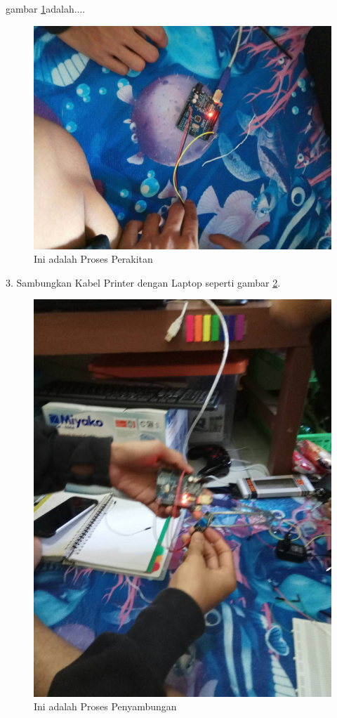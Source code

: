  gambar \ref{ar6}adalah....
  \begin{figure}[ht]
  \centerline{\includegraphics[width=.75\textwidth]{figures/ar6.jpg}}
  \caption{Ini adalah Proses Perakitan}
  \label{ar6}
  \end{figure}

 3. Sambungkan Kabel Printer dengan Laptop seperti gambar \ref{ar7}.
  \begin{figure}[ht]
  \centerline{\includegraphics[width=.75\textwidth]{figures/ar7.jpg}}
  \caption{Ini adalah Proses Penyambungan}
  \label{ar7}
  \end{figure}

